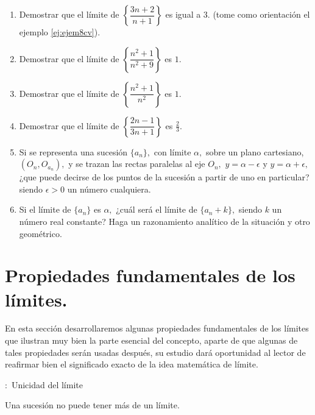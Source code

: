 \begin{ejercicios}[]
\begin{enumerate}
\item Demostrar que el límite de $\left\{ \dfrac{3n+2}{n+1}\right\} $ es
igual a $3.$ (tome como orientación el ejemplo \ref{ej:ejem8cv}).
\item Demostrar que el límite de $\left\{ \dfrac{n^{2}+1}{n^{2}+9}\right\} $
es $1.$
\item Demostrar que el límite de $\left\{ \dfrac{n^{2}+1}{n^{2}}\right\} $
es $1.$
\item Demostrar que el límite de $\left\{ \dfrac{2n-1}{3n+1}\right\} $
es $\frac{2}{3}.$
\item Si se representa una sucesión $\{a_{n}\},$ con límite $\alpha,$
sobre un plano cartesiano, $\left(O_{n},O_{a_{n}}\right),$ y se trazan
las rectas paralelas al eje $O_{n},$ $y=\alpha-\epsilon$ y $y=\alpha+\epsilon,$
¿que puede decirse de los puntos de la sucesión a partir de uno en
particular? siendo $\epsilon>0$ un número cualquiera.
\item Si el límite de $\{a_{n}\}$ es $\alpha,$ ¿cuál será el límite de
$\{a_{n}+k\},$ siendo $k$ un número real constante? Haga un razonamiento
analítico de la situación y otro geométrico. 
\end{enumerate}
\end{ejercicios}

\section{Propiedades fundamentales de los límites.}

En esta sección desarrollaremos algunas propiedades fundamentales
de los límites que ilustran muy bien la parte esencial del concepto,
aparte de que algunas de tales propiedades serán usadas después, su
estudio dará oportunidad al lector de reafirmar bien el significado
exacto de la idea matemática de límite.

\begin{propiedad}{:\ Unicidad del límite}

Una sucesión no puede tener más de un límite.

\end{propiedad}

